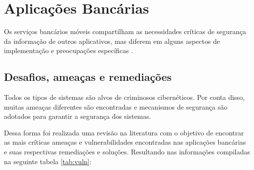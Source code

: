      
    \section{Aplicações Bancárias}
    \label{bancos}
    
    Os serviços bancários móveis compartilham as necessidades críticas de segurança da informação de outros aplicativos, mas diferem em alguns aspectos de implementação e preocupações específicas \cite{Ahmad2015}.
    
    \subsection{Desafios, ameaças e remediações}
    
    Todos os tipos de sistemas são alvos de criminosos cibernéticos. Por conta disso, muitas ameaças diferentes são encontradas e mecanismos de segurança são adotados para garantir a segurança dos sistemas.

    Dessa forma foi realizada uma revisão na literatura com o objetivo de encontrar as mais críticas ameaças e vulnerabilidades encontradas nas aplicações bancárias e suas respectivas remediações e soluções. Resultando nas informações compiladas na seguinte tabela \ref{tab:vuln}: 
    

